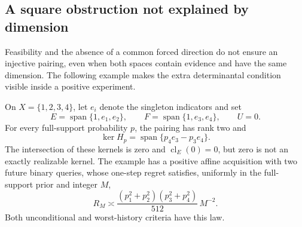 \subsection{A square obstruction not explained by dimension}
Feasibility and the absence of a common forced direction do not ensure
an injective pairing, even when both spaces contain evidence and have
the same dimension. The following example makes the extra determinantal
condition visible inside a positive experiment.

\begin{proposition}
\label{prop:square-moving-kernel}
On $X=\{1,2,3,4\}$, let $e_i$ denote the singleton indicators and set
\[
 E=\operatorname{span}\{1,e_1,e_2\},\qquad
 F=\operatorname{span}\{1,e_3,e_4\},\qquad U=0.
\]
For every full-support probability $p$, the pairing has rank two and
\[
 \ker H_p=\operatorname{span}\{p_4e_3-p_3e_4\}.
\]
The intersection of these kernels is zero and $\operatorname{cl}_E(0)=0$,
but zero is not an exactly realizable kernel. The example has a positive
affine acquisition with two future binary queries, whose one-step
regret satisfies, uniformly in the full-support prior and integer $M$,
\begin{equation}\label{eq:moving-kernel-risk}
 R_M\asymp
 \frac{(p_1^2+p_2^2)(p_3^2+p_4^2)}{512}\,M^{-2}.
\end{equation}
Both unconditional and worst-history criteria have this law.
\end{proposition}
